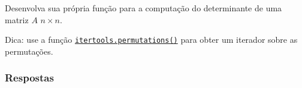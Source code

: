 \begin{exer}
  Desenvolva sua própria função {\python} para a computação do determinante de uma matriz $A$ $n\times n$.
\end{exer}
\begin{resp}
  Dica: use a função \href{https://docs.python.org/3/library/itertools.html\#itertools.permutations}{\lstinline+itertools.permutations()+} para obter um iterador sobre as permutações.
\end{resp}

\ifisbook
\subsubsection{Respostas}
\shipoutAnswer
\fi
